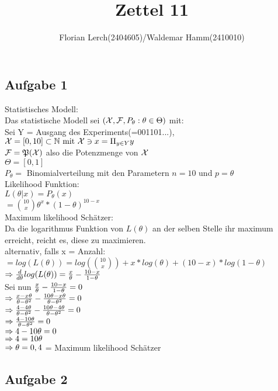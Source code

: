 \documentclass[11pt]{amsart}
\title{Zettel 11 }
\author{Florian Lerch(2404605)/Waldemar Hamm(2410010)}
\begin{document}
\maketitle

\subsection*{Aufgabe 1}
Statistisches Modell: \\
Das statistische Modell sei $(\mathcal{X}, \mathcal{F}, P_{\theta} : \theta \in \Theta)$ mit: \\ 
Sei Y = Ausgang des Experiments(=001101...), $\mathcal{X} = [0,10]\subset \mathbb{N} \mbox{ mit } \mathcal{X} \ni x = \Pi_{y \in Y}y$ \\
$\mathcal{F} = \mathfrak{P}(\mathcal{X})$ also die Potenzmenge von $\mathcal{X}$ \\
$\Theta = [0,1]$ \\
$P_{\theta} =$ Binomialverteilung mit den Parametern $n=10$ und $p = \theta$ \\ %
Likelihood Funktion: \\
$L(\theta | x) = P_{\theta}(x)$ \\ 
$= \binom{10}{x} \theta^{x} * (1-\theta)^{10-x}$ \\
Maximum likelihood Schätzer: \\
Da die logarithmus Funktion von $L(\theta)$ an der selben Stelle ihr maximum erreicht, reicht es, diese zu maximieren. \\
alternativ, falls x = Anzahl: $= log(L(\theta))  = log(\binom{10}{x}) + x*log(\theta) + (10-x)*log(1 - \theta)$ \\
$\Rightarrow \frac{d}{d\theta}log(L(\theta)) = \frac{x}{\theta} - \frac{10-x}{1 - \theta}$ \\ 
Sei nun $\frac{x}{\theta} - \frac{10-x}{1-\theta} = 0$ \\
$\Rightarrow \frac{x-x\theta}{\theta - \theta^2} - \frac{10\theta - x\theta}{\theta - \theta^2} = 0$ \\
$\Rightarrow \frac{4-4\theta}{\theta - \theta^2} - \frac{10\theta - 4\theta}{\theta - \theta^2} = 0$ \\
$\Rightarrow \frac{4-10\theta}{\theta - \theta^2} = 0$ \\
$\Rightarrow 4-10\theta = 0$ \\
$\Rightarrow 4 = 10\theta$ \\
$\Rightarrow \theta = 0,4$ = Maximum likelihood Schätzer\\

\subsection*{Aufgabe 2}
\end{document}
